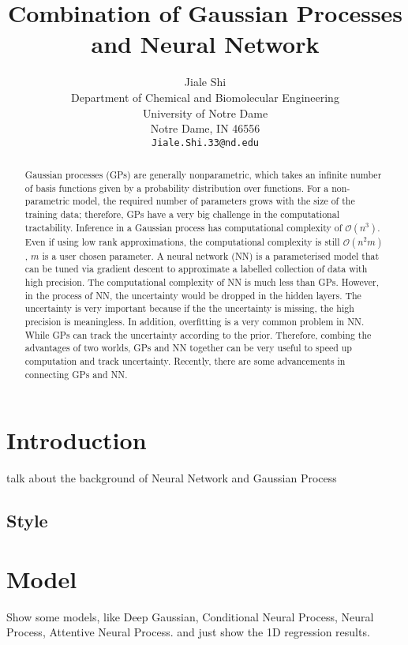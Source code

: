 \documentclass{article}
\title{Combination of Gaussian Processes and Neural Network}
\author{
Jiale Shi\\%
  Department of Chemical and Biomolecular Engineering\\
  University of Notre Dame\\
  Notre Dame, IN 46556 \\
\texttt{Jiale.Shi.33@nd.edu} \\
}
\begin{document}

\maketitle

\begin{abstract}
Gaussian processes (GPs)  are generally nonparametric, which takes an infinite number of basis functions given by a probability distribution over functions. For a non-parametric model, the required number of parameters grows with the size of the training data; therefore, GPs have a very big challenge in the computational tractability. Inference in a Gaussian process has computational complexity of $\mathcal{O}(n^3)$. Even if using low rank approximations, the computational complexity is still $\mathcal{O}(n^2 m)$, $m$ is a user chosen parameter. A neural network (NN) is a parameterised model that can be tuned via gradient descent to approximate a labelled collection of data with high precision. The computational complexity of NN is much less than GPs. However, in the process of NN, the uncertainty would be dropped in the hidden layers. The uncertainty is very important because if the the uncertainty is missing, the high precision is meaningless. In addition, overfitting is a very common problem in NN. While GPs can track the uncertainty according to the prior. Therefore, combing the advantages of two worlds, GPs and NN together can be very useful to speed up computation and track uncertainty. Recently, there are some advancements in connecting GPs and NN.
\end{abstract}

\section{Introduction}
talk about the background of Neural Network and Gaussian Process

\subsection{Style}







\section{Model}
\label{model}

Show some models, like Deep Gaussian, Conditional Neural Process, Neural Process, Attentive Neural Process. and just show the 1D regression results.
\end{document}
